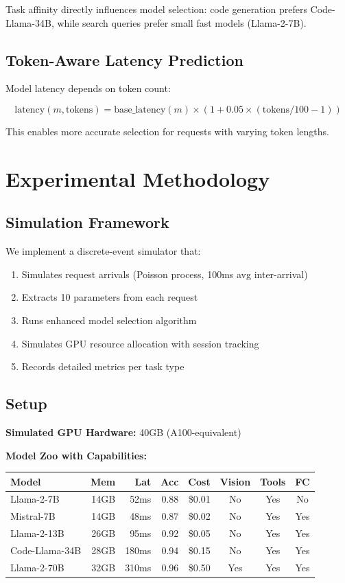 \documentclass[11pt]{article}
\begin{document}
Task affinity directly influences model selection: code generation prefers Code-Llama-34B, while search queries prefer small fast models (Llama-2-7B).

\subsection{Token-Aware Latency Prediction}

Model latency depends on token count:

$$\text{latency}(m, \text{tokens}) = \text{base\_latency}(m) \times (1 + 0.05 \times (\text{tokens}/100 - 1))$$

This enables more accurate selection for requests with varying token lengths.

\section{Experimental Methodology}

\subsection{Simulation Framework}

We implement a discrete-event simulator that:
\begin{enumerate}
    \item Simulates request arrivals (Poisson process, 100ms avg inter-arrival)
    \item Extracts 10 parameters from each request
    \item Runs enhanced model selection algorithm
    \item Simulates GPU resource allocation with session tracking
    \item Records detailed metrics per task type
\end{enumerate}

\subsection{Setup}

\textbf{Simulated GPU Hardware:} 40GB (A100-equivalent)

\textbf{Model Zoo with Capabilities:}

\begin{table}[h]
\centering
\begin{tabular}{lrrrrccc}
\toprule
\textbf{Model} & \textbf{Mem} & \textbf{Lat} & \textbf{Acc} & \textbf{Cost} & \textbf{Vision} & \textbf{Tools} & \textbf{FC} \\
\midrule
Llama-2-7B & 14GB & 52ms & 0.88 & \$0.01 & No & Yes & No \\
Mistral-7B & 14GB & 48ms & 0.87 & \$0.02 & No & Yes & Yes \\
Llama-2-13B & 26GB & 95ms & 0.92 & \$0.05 & No & Yes & Yes \\
Code-Llama-34B & 28GB & 180ms & 0.94 & \$0.15 & No & Yes & Yes \\
Llama-2-70B & 32GB & 310ms & 0.96 & \$0.50 & Yes & Yes & Yes \\
\bottomrule
\end{tabular}
\end{table}
\end{document}

